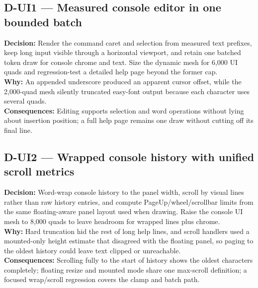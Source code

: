 \subsection*{D-UI1 --- Measured console editor in one bounded batch}
\begin{decisionbox}[title={D-UI1 \quad 2026-08-04}]
\textbf{Decision:} Render the command caret and selection from measured text
prefixes, keep long input visible through a horizontal viewport, and retain one
batched token draw for console chrome and text. Size the dynamic mesh for 6,000
UI quads and regression-test a detailed help page beyond the former cap.\\
\textbf{Why:} An appended underscore produced an apparent cursor offset, while
the 2,000-quad mesh silently truncated easy-font output because each character
uses several quads.\\
\textbf{Consequences:} Editing supports selection and word operations without
lying about insertion position; a full help page remains one draw without
cutting off its final line.
\end{decisionbox}

\subsection*{D-UI2 --- Wrapped console history with unified scroll metrics}
\begin{decisionbox}[title={D-UI2 \quad 2026-08-06}]
\textbf{Decision:} Word-wrap console history to the panel width, scroll by
visual lines rather than raw history entries, and compute PageUp/wheel/scrollbar
limits from the same floating-aware panel layout used when drawing. Raise the
console UI mesh to 8,000 quads to leave headroom for wrapped lines plus chrome.\\
\textbf{Why:} Hard truncation hid the rest of long help lines, and scroll
handlers used a mounted-only height estimate that disagreed with the floating
panel, so paging to the oldest history could leave text clipped or unreachable.\\
\textbf{Consequences:} Scrolling fully to the start of history shows the oldest
characters completely; floating resize and mounted mode share one max-scroll
definition; a focused wrap/scroll regression covers the clamp and batch path.
\end{decisionbox}

